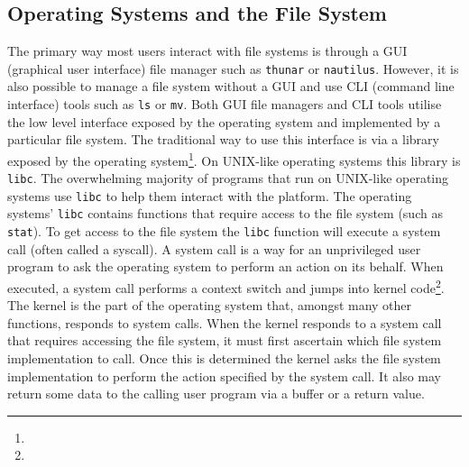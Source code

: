 \subsection{Operating Systems and the File System}


The primary way most users interact with file systems is through a GUI
(graphical user interface) file manager such as \texttt{thunar} or
\texttt{nautilus}. 
However, it is also possible to manage a file system without a GUI and use CLI
(command line interface) tools such as \texttt{ls} or \texttt{mv}. Both GUI
file managers and CLI tools utilise the low level interface exposed by the
operating system and implemented by a particular file system. The traditional
way to use this interface is via a library exposed by the operating
system\footnote{}.  On UNIX-like operating systems this library is \texttt{libc}.
 The overwhelming majority of programs that run on
UNIX-like operating systems use \texttt{libc} to help them interact with the
platform. The operating systems' \texttt{libc} contains functions that require
access to the file system (such as \texttt{stat}). To get access to the file
system the \texttt{libc} function will execute a system call (often called a
syscall). A system call is a way for an unprivileged user program to ask the
operating system to perform an action on its behalf. When executed, a system
call performs a context switch and jumps into kernel code\footnote{}. The kernel is the part
of the operating system that, amongst many other functions, responds to system
calls. When the kernel responds to a system call that requires accessing the
file system, it must first ascertain which file system implementation to call.
 Once this is determined
the kernel asks the file system implementation to perform the action specified
by the system call. It also may return some data to the calling user program
via a buffer or a return value.
